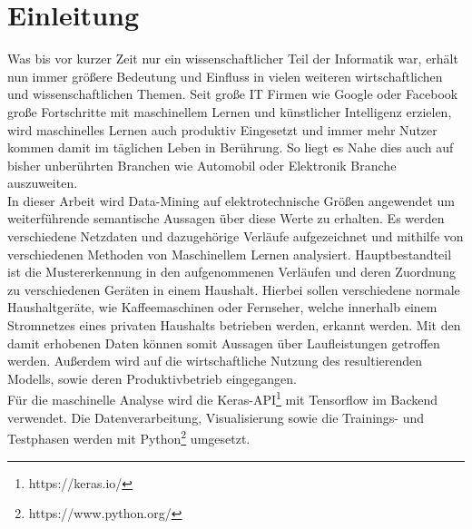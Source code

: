 \chapter{Einleitung}

    Was bis vor kurzer Zeit nur ein wissenschaftlicher Teil der Informatik war, erhält nun immer größere Bedeutung und Einfluss in vielen weiteren wirtschaftlichen und wissenschaftlichen Themen. 
    Seit große IT Firmen wie Google oder Facebook große Fortschritte mit maschinellem Lernen und künstlicher Intelligenz erzielen, wird maschinelles Lernen auch produktiv Eingesetzt und immer mehr Nutzer kommen damit im täglichen Leben in Berührung.
    So liegt es Nahe dies auch auf bisher unberührten Branchen wie Automobil oder Elektronik Branche auszuweiten.\\
    \newline
    In dieser Arbeit wird Data-Mining auf elektrotechnische Größen angewendet um weiterführende semantische Aussagen über diese Werte zu erhalten. 
    Es werden verschiedene Netzdaten und dazugehörige Verläufe aufgezeichnet und mithilfe von verschiedenen Methoden von Maschinellem Lernen analysiert.
    Hauptbestandteil ist die Mustererkennung in den aufgenommenen Verläufen und deren Zuordnung zu verschiedenen Geräten in einem Haushalt. 
    Hierbei sollen verschiedene normale Haushaltgeräte, wie Kaffeemaschinen oder Fernseher, welche innerhalb einem Stromnetzes eines privaten Haushalts betrieben werden, erkannt werden.
    Mit den damit erhobenen Daten können somit Aussagen über Laufleistungen getroffen werden.
    Außerdem wird auf die wirtschaftliche Nutzung des resultierenden Modells, sowie deren Produktivbetrieb eingegangen.\\
    \newline
    Für die maschinelle Analyse wird die Keras-API\footnote{https://keras.io/} mit Tensorflow im Backend verwendet.
    Die Datenverarbeitung, Visualisierung sowie die Trainings- und Testphasen werden mit Python\footnote{https://www.python.org/} umgesetzt.
